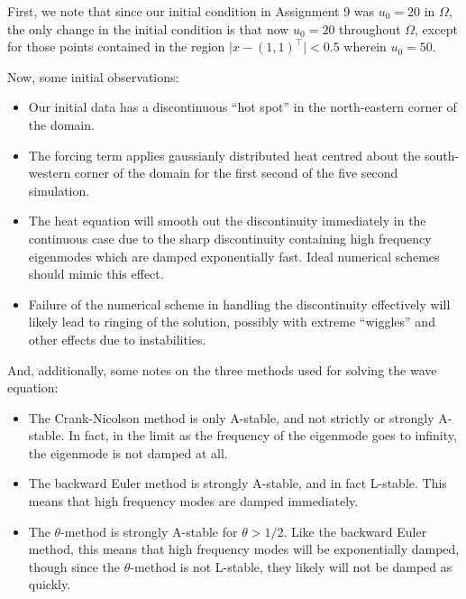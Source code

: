 \vspace{0.5cm}
\begin{solution}
First, we note that since our initial condition in Assignment 9 was $u_0 = 20$ in $\Omega$, the only change in the initial condition is that now $u_0 = 20$ throughout $\Omega$, except for those points contained in the region $\lvert x - (1,1)^\top \rvert < 0.5$ wherein $u_0 = 50$.

Now, some initial observations:
\begin{itemize}
\item Our initial data has a discontinuous ``hot spot'' in the north-eastern corner of the domain.
\item The forcing term applies gaussianly distributed heat centred about the south-western corner of the domain for the first second of the five second simulation.
\item The heat equation will smooth out the discontinuity immediately in the continuous case due to the sharp discontinuity containing high frequency eigenmodes which are damped exponentially fast.
Ideal numerical schemes should mimic this effect.
\item Failure of the numerical scheme in handling the discontinuity effectively will likely lead to ringing of the solution, possibly with extreme ``wiggles'' and other effects due to instabilities.
\end{itemize}

And, additionally, some notes on the three methods used for solving the wave equation:
\begin{itemize}
\item The Crank-Nicolson method is only A-stable, and not strictly or strongly A-stable. In fact, in the limit as the frequency of the eigenmode goes to infinity, the eigenmode is not damped at all.
\item The backward Euler method is strongly A-stable, and in fact L-stable. This means that high frequency modes are damped immediately.
\item The $\theta$-method is strongly A-stable for $\theta > 1/2$. Like the backward Euler method, this means that high frequency modes will be exponentially damped, though since the $\theta$-method is not L-stable, they likely will not be damped as quickly.
\end{itemize}

\newpage

\end{solution}
